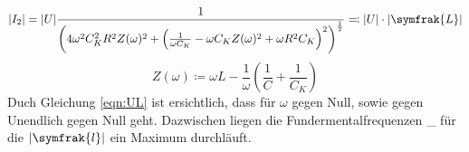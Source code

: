 \begin{equation}
  \lvert I_2 \rvert = \lvert U \rvert \frac{1}{\left( 4\omega^2 C_{K}^2 R^2 Z(\omega)^2 + \left( \frac{1}{\omega C_K}-\omega C_K Z(\omega)^2 + \omega R^2 C_K\right)^2 \right)^{\frac{1}{2}}}
  \eqcolon \lvert U \rvert \cdot \lvert \symfrak{L} \rvert
  \label{eqn:UL}
\end{equation}
\begin{equation*}
Z(\omega) \coloneq  \omega L - \frac{1}{\omega}\left(\frac{1}{C} + \frac{1}{C_K} \right)
\end{equation*}
Duch Gleichung \eqref{eqn:UL} ist ersichtlich, dass für $\omega$ gegen Null, sowie gegen Unendlich gegen Null geht. Dazwischen liegen die Fundermentalfrequenzen \omega_{\pm} für
die $\lvert \symfrak{l} \rvert $ ein Maximum durchläuft.
